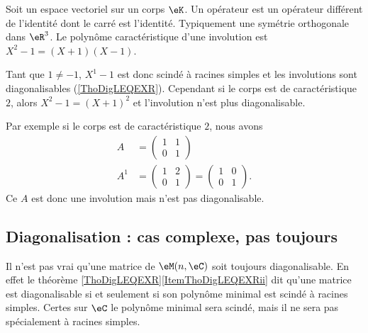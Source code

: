 \begin{example}     \label{ExewINgYo}
    Soit un espace vectoriel sur un corps \( \eK\). Un opérateur  est un opérateur différent de l'identité dont le carré est l'identité. Typiquement une symétrie orthogonale dans \( \eR^3\). Le polynôme caractéristique d'une involution est \( X^2-1=(X+1)(X-1)\).
    
    Tant que \( 1\neq -1\), \( X^1-1\) est donc scindé à racines simples et les involutions sont diagonalisables (\ref{ThoDigLEQEXR}). Cependant si le corps est de caractéristique \( 2\), alors \( X^2-1=(X+1)^2\) et l'involution n'est plus diagonalisable.

    Par exemple si le corps est de caractéristique \( 2\), nous avons
    \begin{subequations}
        \begin{align}
            A&=\begin{pmatrix}
                1    &   1    \\ 
                0    &   1    
            \end{pmatrix}\\
            A^1&=\begin{pmatrix}
                1    &   2    \\ 
                0    &   1    
            \end{pmatrix}=\begin{pmatrix}
                1    &   0    \\ 
                0    &   1    
            \end{pmatrix}.
        \end{align}
    \end{subequations}
    Ce \( A\) est donc une involution mais n'est pas diagonalisable.
\end{example}

\subsection{Diagonalisation : cas complexe, pas toujours}

Il n'est pas vrai qu'une matrice de \( \eM(n,\eC)\) soit toujours diagonalisable. En effet le théorème \ref{ThoDigLEQEXR}\ref{ItemThoDigLEQEXRii} dit qu'une matrice est diagonalisable si et seulement si son polynôme minimal est scindé à racines simples. Certes sur \( \eC\) le polynôme minimal sera scindé, mais il ne sera pas spécialement à racines simples.

